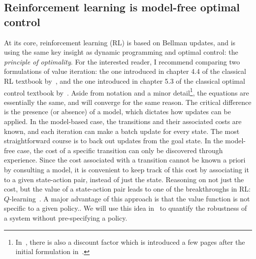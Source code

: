 
\subsection{Reinforcement learning is model-free optimal control}
At its core, reinforcement learning (RL) is based on Bellman updates, and is using the same key insight as dynamic programming and optimal control: the \emph{principle of optimality}.
For the interested reader, I recommend comparing two formulations of value iteration: the one introduced in chapter 4.4 of the classical RL textbook by~\textcite{sutton2018book}, and the one introduced in chapter 5.3 of the classical optimal control textbook by~\textcite{bertsekas2017book}. Aside from notation and a minor detail\footnote{In~\cite{sutton2018book}, there is also a discount factor which is introduced a few pages after the initial formulation in~\cite{bertsekas2017book}.}, the equations are essentially the same, and will converge for the same reason. The critical difference is the presence (or absence) of a model, which dictates how updates can be applied.
In the model-based case, the transitions and their associated costs are known, and each iteration can make a batch update for every state. The most straightforward course is to back out updates from the goal state. In the model-free case, the cost of a specific transition can only be discovered through experience.
Since the cost associated with a transition cannot be known a priori by consulting a model, it is convenient to keep track of this cost by associating it to a given state-action pair, instead of just the state. Reasoning on not just the cost, but the value of a state-action pair leads to one of the breakthroughs in RL: $Q$-learning~\cite[cf. chapter 6.5]{sutton2018book}. A major advantage of this approach is that the value function is not specific to a given policy.. We will use this idea in~\cite{heim2019beyond} to quantify the robustness of a system without pre-specifying a policy.

